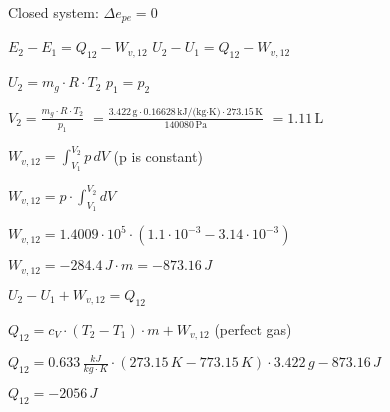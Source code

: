 Closed system:  
\( \Delta e_{pe} = 0 \)  

\( E_2 - E_1 = Q_{12} - W_{v,12} \)  
\( U_2 - U_1 = Q_{12} - W_{v,12} \)  

\( U_2 = m_g \cdot R \cdot T_2 \)  
\( p_{1} = p_{2} \)  

\( V_2 = \frac{m_g \cdot R \cdot T_2}{p_1} \)  
\( = \frac{3.422 \, \text{g} \cdot 0.16628 \, \text{kJ/(kg·K)} \cdot 273.15 \, \text{K}}{140080 \, \text{Pa}} \)  
\( = 1.11 \, \text{L} \)

\( W_{v,12} = \int_{V_1}^{V_2} p \, dV \)  
(p is constant)  

\( W_{v,12} = p \cdot \int_{V_1}^{V_2} dV \)  

\( W_{v,12} = 1.4009 \cdot 10^5 \cdot (1.1 \cdot 10^{-3} - 3.14 \cdot 10^{-3}) \)  

\( W_{v,12} = -284.4 \, J \cdot m = -873.16 \, J \)  

\( U_2 - U_1 + W_{v,12} = Q_{12} \)  

\( Q_{12} = c_V \cdot (T_2 - T_1) \cdot m + W_{v,12} \) (perfect gas)  

\( Q_{12} = 0.633 \, \frac{kJ}{kg \cdot K} \cdot (273.15 \, K - 773.15 \, K) \cdot 3.422 \, g - 873.16 \, J \)  

\( Q_{12} = -2056 \, J \)